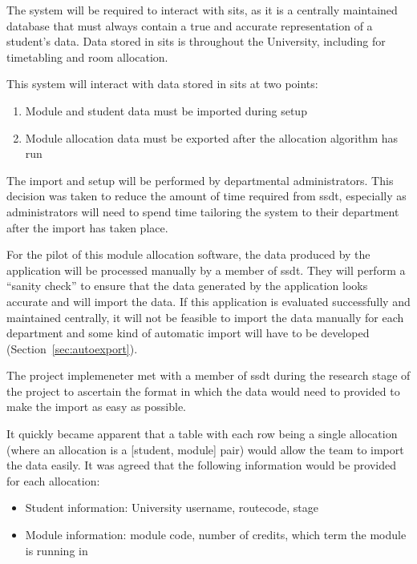 \documentclass[draft]{scrartcl}
\begin{document}
The system will be required to interact with \gls{sits}, as it is a centrally
maintained database that must always contain a true and accurate
representation of a student's data. Data stored in \gls{sits} is throughout
the University, including for timetabling and room allocation.

This system will interact with data stored in \gls{sits} at two points:

\begin{enumerate}
  \item Module and student data must be imported during setup
  \item Module allocation data must be exported after the allocation algorithm has run
\end{enumerate}

The import and setup will be performed by departmental administrators. This
decision was taken to reduce the amount of time required from \gls{ssdt},
especially as administrators will need to spend time tailoring the system to
their department after the import has taken place.

For the pilot of this module allocation software, the data produced by the
application will be processed manually by a member of \gls{ssdt}. They will
perform a ``sanity check'' to ensure that the data generated by the
application looks accurate and will import the data. If this application is
evaluated successfully and maintained centrally, it will not be feasible to
import the data manually for each department and some kind of automatic import
will have to be developed (Section~\ref{sec:autoexport}).

The project implemeneter met with a member of \gls{ssdt} during the research
stage of the project to ascertain the format in which the data would need to
provided to make the import as easy as possible.

It quickly became apparent that a table with each row being a single
allocation (where an allocation is a [student, module] pair) would allow the
team to import the data easily. It was agreed that the following information
would be provided for each allocation:

\begin{itemize}
  \item Student information: University username, \gls{routecode}, \gls{stage}
  \item Module information: module code, number of credits, which term the module is running in
\end{itemize}
\end{document}
